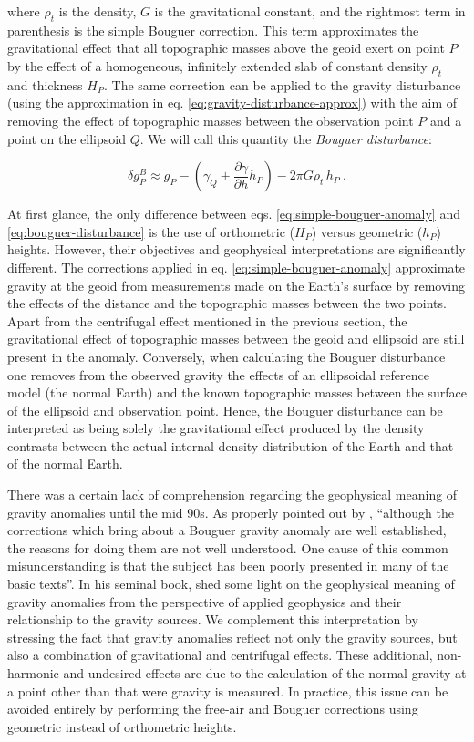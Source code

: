 \documentclass[extra]{gji}
\begin{document}
\noindent
where $\rho_t$ is the density, $G$ is the gravitational constant,
and the rightmost term in parenthesis is the simple Bouguer correction.
This term approximates the gravitational effect that all topographic
masses above the geoid exert on point $P$ by the effect of a homogeneous,
infinitely extended slab of constant density $\rho_{t}$ and thickness $H_{P}$.
The same correction can be applied to the gravity disturbance
(using the approximation in eq. \ref{eq:gravity-disturbance-approx})
with the aim of removing the effect of topographic masses between
the observation point $P$ and a point on the ellipsoid $Q$.
We will call this quantity the \textit{Bouguer disturbance}:

\begin{equation}
\delta g_P^{B} \approx
g_{P} -
\left( \gamma_{Q} + \frac{\partial \gamma}{\partial h} h_P \right)
- 2 \pi G \rho_{t} \, h_{P} \: .
\label{eq:bouguer-disturbance}
\end{equation}

At first glance, the only difference between eqs.
\ref{eq:simple-bouguer-anomaly} and \ref{eq:bouguer-disturbance} is the use of
orthometric ($H_P$) versus geometric ($h_P$) heights.
However, their objectives and geophysical interpretations are significantly
different.
The corrections applied in eq. \ref{eq:simple-bouguer-anomaly} approximate
gravity at the geoid from measurements made on the Earth's surface by removing
the effects of the distance and the topographic masses between the two points.
Apart from the centrifugal effect mentioned in the previous section,
the gravitational effect of topographic masses between the geoid and ellipsoid
are still present in the anomaly.
Conversely, when calculating the Bouguer disturbance one removes from
the observed gravity the effects of an ellipsoidal reference model (the normal
Earth) and the known topographic masses between the surface of the ellipsoid
and observation point.
Hence, the Bouguer disturbance can be interpreted as being solely the
gravitational effect produced by the density contrasts between the actual
internal density distribution of the Earth and that of the normal Earth.

There was a certain lack of comprehension regarding the geophysical meaning of
gravity anomalies until the mid 90s.
As properly pointed out by \citet{chapin1996},
``although the corrections which bring about a Bouguer gravity anomaly are well
established, the reasons for doing them are not well understood. One cause of
this common misunderstanding is that the subject has been poorly presented in
many of the basic texts''.
In his seminal book, \citet{blakely1996} shed some light on the geophysical
meaning of gravity anomalies from the perspective of applied geophysics and
their relationship to the gravity sources.
We complement this interpretation by stressing the fact that
gravity anomalies reflect not only the gravity sources,
but also a combination of gravitational and centrifugal effects.
These additional, non-harmonic and undesired effects are due to the calculation
of the normal gravity at a point other than that were gravity is measured.
In practice, this issue can be avoided entirely by performing the free-air and
Bouguer corrections using geometric instead of orthometric heights.
\end{document}
